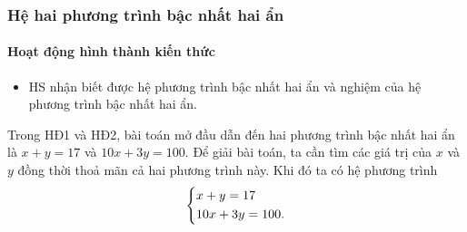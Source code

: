 \subsubsection{Hệ hai phương trình bậc nhất hai ẩn}

\paragraph{Hoạt động hình thành kiến thức}

\muctieu

\begin{itemize}
    \item HS nhận biết được hệ phương trình bậc nhất hai ẩn và nghiệm của hệ phương trình bậc nhất hai ẩn. 
\end{itemize}

\noidungsanpham

\begin{dhnh}
    Trong HĐ1 và HĐ2, bài toán mở đầu dẫn đến hai phương trình bậc nhất hai ẩn là $x + y = 17$ và $10x + 3y = 100$. Để giải bài toán, ta cần tìm các giá trị của $x$ và $y$ đồng thời thoả mãn cả hai phương trình này. Khi đó ta có hệ phương trình $$\left\{\begin{aligned}&x+y=17\\&10x+3y=100.\end{aligned}\right.$$
\end{dhnh}

\tochucthuchien

